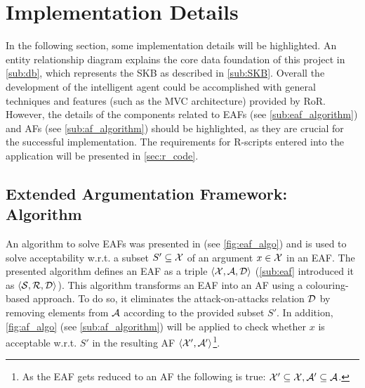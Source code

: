 \section{Implementation Details}
\label{sec:implementation}
In the following section, some implementation details will be highlighted. An entity relationship diagram explains the core data foundation of this project in \autoref{sub:db}, which represents the \gls{SKB} as described in \autoref{sub:SKB}. Overall the development of the intelligent agent could be accomplished with general techniques and features (such as the \gls{MVC} architecture) provided by \gls{RoR}. However, the details of the components related to \glspl{EAF} (see \autoref{sub:eaf_algorithm}) and \glspl{AF} (see \autoref{sub:af_algorithm}) should be highlighted, as they are crucial for the successful implementation. The requirements for \gls{R}-scripts entered into the application will be presented in \autoref{sec:r_code}.
	




\subsection{Extended Argumentation Framework: Algorithm}
\label{sub:eaf_algorithm}

An algorithm to solve \glspl{EAF} was presented in \cite{Dunne10computationin} (see \cref{fig:eaf_algo}) and is used to solve acceptability w.r.t. a subset $S' \subseteq \mathcal{X}$ of an argument $x \in \mathcal{X}$ in an \gls{EAF}. The presented algorithm defines an \gls{EAF} as a triple $\langle \mathcal{X}, \mathcal{A}, \mathcal{D} \rangle$ (\autoref{sub:eaf} introduced it as $\langle \mathcal{S}, \mathcal{R}, \mathcal{D} \rangle$).
This algorithm transforms an \gls{EAF} into an \gls{AF} using a colouring-based approach. To do so, it eliminates the attack-on-attacks relation $\mathcal{D}$ by removing elements from $\mathcal{A}$ according to the provided subset $S'$. In addition, \cref{fig:af_algo} (see \cref{sub:af_algorithm}) will be applied to check whether $x$ is acceptable w.r.t. $S'$ in the resulting AF $\langle \mathcal{X}', \mathcal{A}' \rangle$\footnote{As the \gls{EAF} gets reduced to an \gls{AF} the following is true: $\mathcal{X}' \subseteq \mathcal{X}, \mathcal{A}' \subseteq \mathcal{A}$.}.


